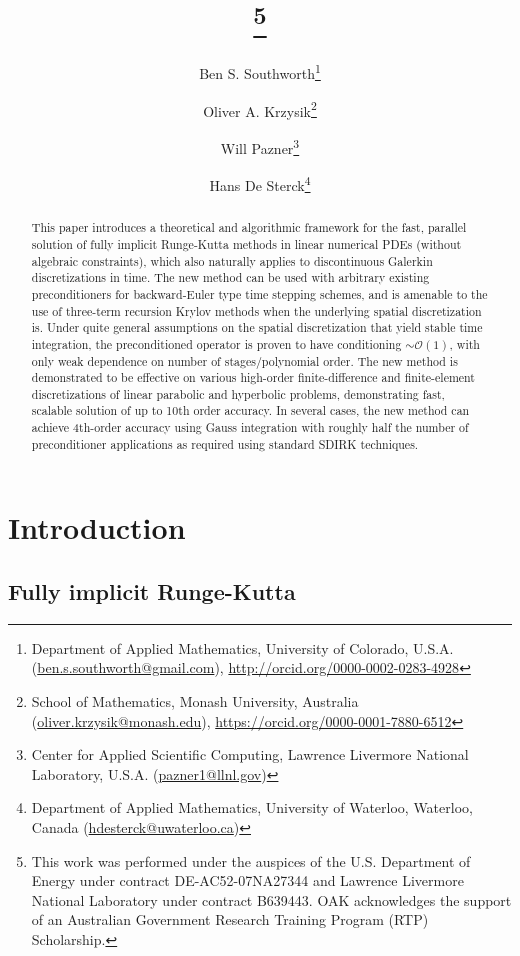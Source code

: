 \documentclass[review]{siamart}
\title{{\TheTitle}\thanks{This work was  performed under the auspices of the U.S.
Department of Energy under contract DE-AC52-07NA27344 and Lawrence Livermore National Laboratory under  contract B639443. OAK acknowledges the support of an Australian Government Research Training Program (RTP) Scholarship.}}
\author{
	Ben S. Southworth\thanks{Department of Applied Mathematics,
    University of Colorado,
    U.S.A. (\url{ben.s.southworth@gmail.com}),
    \url{http://orcid.org/0000-0002-0283-4928}}
\and
    Oliver A. Krzysik\thanks{School of Mathematics, Monash University,
  	Australia (\url{oliver.krzysik@monash.edu}),
  	\url{https://orcid.org/0000-0001-7880-6512}}
\and
  	Will Pazner\thanks{Center for Applied Scientific Computing, Lawrence Livermore National Laboratory,
    U.S.A. (\url{pazner1@llnl.gov})}
\and
    Hans De Sterck\thanks{Department of Applied Mathematics,
  	University of Waterloo,
  	Waterloo, Canada
  	(\url{hdesterck@uwaterloo.ca})}
}
\begin{document}
\maketitle
\allowdisplaybreaks

\begin{abstract}
This paper introduces a theoretical and algorithmic framework for the fast, parallel
solution of fully implicit Runge-Kutta methods in linear numerical PDEs (without algebraic
constraints), which also naturally applies to discontinuous Galerkin discretizations
in time. The new
method can be used with arbitrary existing preconditioners for backward-Euler type
time stepping schemes, and is amenable to the use of three-term recursion Krylov
methods when the underlying spatial discretization is.
Under quite general assumptions on the spatial discretization that yield stable time
integration, the preconditioned operator is proven to have conditioning $\sim\mathcal{O}(1)$,
with only weak dependence on number of stages/polynomial order. The new method is
demonstrated to be effective on various high-order finite-difference and
finite-element discretizations of linear parabolic and hyperbolic problems,
demonstrating fast, scalable solution of up to 10th order accuracy. In several
cases, the new method can achieve 4th-order accuracy using Gauss integration
with roughly half the number of preconditioner applications as required using
standard SDIRK techniques.
\end{abstract}


\section{Introduction}\label{sec:intro}

\subsection{Fully implicit Runge-Kutta}\label{sec:intro:irk}
\end{document}
